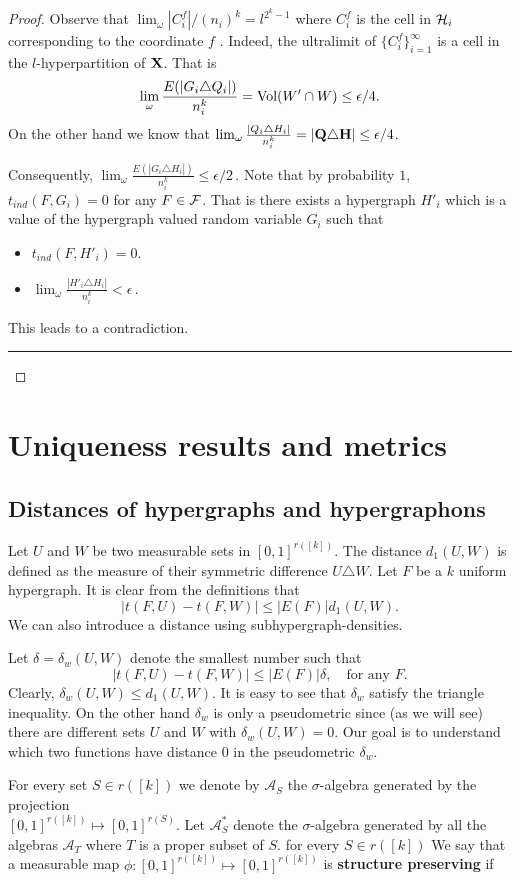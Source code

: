 \documentclass [11pt] {article}
\newcommand{\qed} {\hspace {0.1in} \rule {1.5mm} {3.5mm}}
\def\e{\epsilon}
\def\limo{\lim_{\omega}}
\def\cH{\mbox{$\cal H$}}
\def\cF{\mbox{$\cal F$}}
\begin{document}
\begin{proof}
\noindent
Observe that $\limo |C_i^f|/(n_i)^k=l^{2^k-1}$ 
where $C_i^f$ is the cell in $\cH_i$ corresponding to
the coordinate $f$ . Indeed, the ultralimit of $\{C_i^f\}^\infty_{i=1}$
is a cell in the $l$-hyperpartition of ${\bf X}$.
 That is $$\limo
\frac{E(|G_i\triangle Q_i|)} {n_i^k}={\rm Vol}(W'\cap W)\leq \e/4.$$
 On the other hand we know 
that 
$\limo \frac{|Q_i\triangle H_i|} {n_i^k}=|{\bf Q}\triangle {\bf H}|\leq \e/4$.

\noindent
Consequently, $\limo \frac{E(|G_i\triangle H_i|)} {n_i^k}\leq \e/2\,.$
Note that by probability $1$, $t_{ind}(F,G_i)=0$ for any $F\in \cF$.
That is there exists a hypergraph $H'_i$ which is a value of the
hypergraph valued random variable $G_i$ such that
\begin{itemize}
\item $t_{ind}(F, H'_i)=0.$
\item $\limo \frac{|H'_i\triangle H_i|} {n_i^k}< \e\,.$
\end{itemize}
This leads to a contradiction. \qed


\end{proof}


\section{Uniqueness results and metrics}

\subsection{Distances of hypergraphs and hypergraphons}

Let $U$ and $W$ be two measurable sets in $[0,1]^{r([k])}$. 
The distance $d_1(U,W)$ is defined as the measure of their symmetric 
difference $U\triangle W$.
Let $F$ be a $k$ uniform hypergraph. It is clear from the definitions that
$$|t(F,U)-t(F,W)|\leq |E(F)|d_1(U,W).$$
We can also introduce a distance using subhypergraph-densities.

Let $\delta=\delta_w(U,W)$ denote the smallest number such that
$$|t(F,U)-t(F,W)|\leq |E(F)|\delta,\quad\mbox{for any $F$}.$$
Clearly, $\delta_w(U,W)\leq d_1(U,W)$. It is easy to see that 
$\delta_w$ satisfy the triangle inequality. On the other hand $\delta_w$ 
is only a pseudometric since (as we will see) there are different sets 
$U$ and $W$ with $\delta_w(U,W)=0$. Our goal is to understand which two 
functions have distance $0$ in the pseudometric $\delta_w$.

For every set $S\in r([k])$ we denote by $\mathcal{A}_S$ the $\sigma$-algebra
generated by the projection \\ $[0,1]^{r([k])}\mapsto[0,1]^{r(S)}$. 
 Let $\mathcal{A}_S^*$ denote the $\sigma$-algebra generated by all 
the algebras $\mathcal{A}_T$ where $T$ is a proper subset of $S$.
for every $S\in r([k])$
We say that a measurable map $\phi:[0,1]^{r([k])}\mapsto[0,1]^{r([k])}$ is 
{\bf structure preserving} if
\end{document}

